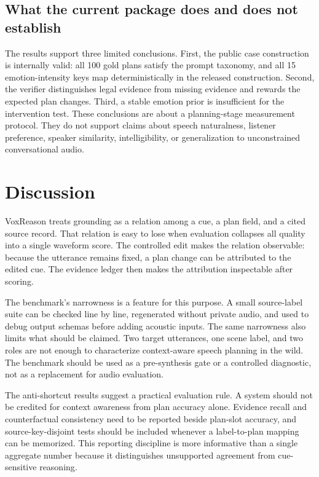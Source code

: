 \documentclass{article}
\begin{document}
\subsection{What the current package does and does not establish}

The results support three limited conclusions. First, the public case construction is internally valid: all 100 gold plans satisfy the prompt taxonomy, and all 15 emotion-intensity keys map deterministically in the released construction. Second, the verifier distinguishes legal evidence from missing evidence and rewards the expected plan changes. Third, a stable emotion prior is insufficient for the intervention test. These conclusions are about a planning-stage measurement protocol. They do not support claims about speech naturalness, listener preference, speaker similarity, intelligibility, or generalization to unconstrained conversational audio.

\section{Discussion}

VoxReason treats grounding as a relation among a cue, a plan field, and a cited source record. That relation is easy to lose when evaluation collapses all quality into a single waveform score. The controlled edit makes the relation observable: because the utterance remains fixed, a plan change can be attributed to the edited cue. The evidence ledger then makes the attribution inspectable after scoring.

The benchmark's narrowness is a feature for this purpose. A small source-label suite can be checked line by line, regenerated without private audio, and used to debug output schemas before adding acoustic inputs. The same narrowness also limits what should be claimed. Two target utterances, one scene label, and two roles are not enough to characterize context-aware speech planning in the wild. The benchmark should be used as a pre-synthesis gate or a controlled diagnostic, not as a replacement for audio evaluation.

The anti-shortcut results suggest a practical evaluation rule. A system should not be credited for context awareness from plan accuracy alone. Evidence recall and counterfactual consistency need to be reported beside plan-slot accuracy, and source-key-disjoint tests should be included whenever a label-to-plan mapping can be memorized. This reporting discipline is more informative than a single aggregate number because it distinguishes unsupported agreement from cue-sensitive reasoning.
\end{document}
